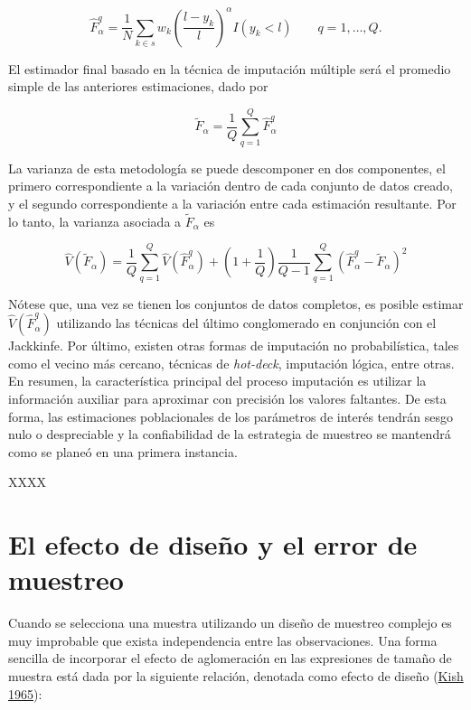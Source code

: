 \documentclass[
  12pt,
  spanish,
]{book}
\begin{document}
\[
\hat{F}_{\alpha}^{q}=\frac{1}{N}\sum_{k\in s} w_k 
\left(\frac{l-y_k}{l}\right)^{\alpha}I(y_k<l) \ \ \ \ \ \ \ \ \ 
q= 1,\ldots, Q.
\]

El estimador final basado en la técnica de imputación múltiple será el promedio simple de las anteriores estimaciones, dado por

\[
\tilde{F}_{\alpha}=\frac{1}{Q}\sum_{q=1}^Q \hat{F}_{\alpha}^{q}
\]

La varianza de esta metodología se puede descomponer en dos componentes, el primero correspondiente a la variación dentro de cada conjunto de datos creado, y el segundo correspondiente a la variación entre cada estimación resultante. Por lo tanto, la varianza asociada a \(\tilde{F}_{\alpha}\) es

\[
\hat{V}(\tilde{F}_{\alpha})
= \frac{1}{Q}\sum_{q=1}^Q \hat{V}(\hat{F}_{\alpha}^{q})
+ \left(1+\frac{1}{Q}\right)\frac{1}{Q-1}\sum_{q=1}^Q (\hat{F}_{\alpha}^{q}-\tilde{F}_{\alpha})^2
\]

Nótese que, una vez se tienen los conjuntos de datos completos, es posible estimar \(\hat{V}(\hat{F}_{\alpha}^{q})\) utilizando las técnicas del último conglomerado en conjunción con el Jackkinfe. Por último, existen otras formas de imputación no probabilística, tales como el vecino más cercano, técnicas de \emph{hot-deck}, imputación lógica, entre otras. En resumen, la característica principal del proceso imputación es utilizar la información auxiliar para aproximar con precisión los valores faltantes. De esta forma, las estimaciones poblacionales de los parámetros de interés tendrán sesgo nulo o despreciable y la confiabilidad de la estrategia de muestreo se mantendrá como se planeó en una primera instancia.

XXXX

\hypertarget{el-efecto-de-diseuxf1o-y-el-error-de-muestreo}{%
\section{El efecto de diseño y el error de muestreo}\label{el-efecto-de-diseuxf1o-y-el-error-de-muestreo}}

Cuando se selecciona una muestra utilizando un diseño de muestreo complejo es muy improbable que exista independencia entre las observaciones. Una forma sencilla de incorporar el efecto de aglomeración en las expresiones de tamaño de muestra está dada por la siguiente relación, denotada como efecto de diseño (\protect\hyperlink{ref-Kish_1965}{Kish 1965}):
\end{document}
